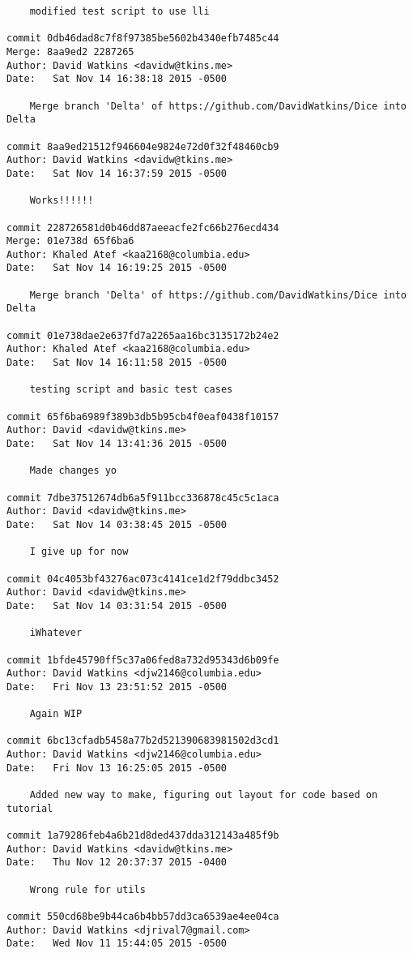 \begin{verbatim}
    modified test script to use lli

commit 0db46dad8c7f8f97385be5602b4340efb7485c44
Merge: 8aa9ed2 2287265
Author: David Watkins <davidw@tkins.me>
Date:   Sat Nov 14 16:38:18 2015 -0500

    Merge branch 'Delta' of https://github.com/DavidWatkins/Dice into Delta

commit 8aa9ed21512f946604e9824e72d0f32f48460cb9
Author: David Watkins <davidw@tkins.me>
Date:   Sat Nov 14 16:37:59 2015 -0500

    Works!!!!!!

commit 228726581d0b46dd87aeeacfe2fc66b276ecd434
Merge: 01e738d 65f6ba6
Author: Khaled Atef <kaa2168@columbia.edu>
Date:   Sat Nov 14 16:19:25 2015 -0500

    Merge branch 'Delta' of https://github.com/DavidWatkins/Dice into Delta

commit 01e738dae2e637fd7a2265aa16bc3135172b24e2
Author: Khaled Atef <kaa2168@columbia.edu>
Date:   Sat Nov 14 16:11:58 2015 -0500

    testing script and basic test cases

commit 65f6ba6989f389b3db5b95cb4f0eaf0438f10157
Author: David <davidw@tkins.me>
Date:   Sat Nov 14 13:41:36 2015 -0500

    Made changes yo

commit 7dbe37512674db6a5f911bcc336878c45c5c1aca
Author: David <davidw@tkins.me>
Date:   Sat Nov 14 03:38:45 2015 -0500

    I give up for now

commit 04c4053bf43276ac073c4141ce1d2f79ddbc3452
Author: David <davidw@tkins.me>
Date:   Sat Nov 14 03:31:54 2015 -0500

    iWhatever

commit 1bfde45790ff5c37a06fed8a732d95343d6b09fe
Author: David Watkins <djw2146@columbia.edu>
Date:   Fri Nov 13 23:51:52 2015 -0500

    Again WIP

commit 6bc13cfadb5458a77b2d521390683981502d3cd1
Author: David Watkins <djw2146@columbia.edu>
Date:   Fri Nov 13 16:25:05 2015 -0500

    Added new way to make, figuring out layout for code based on tutorial

commit 1a79286feb4a6b21d8ded437dda312143a485f9b
Author: David Watkins <davidw@tkins.me>
Date:   Thu Nov 12 20:37:37 2015 -0400

    Wrong rule for utils

commit 550cd68be9b44ca6b4bb57dd3ca6539ae4ee04ca
Author: David Watkins <djrival7@gmail.com>
Date:   Wed Nov 11 15:44:05 2015 -0500


\end{verbatim}
